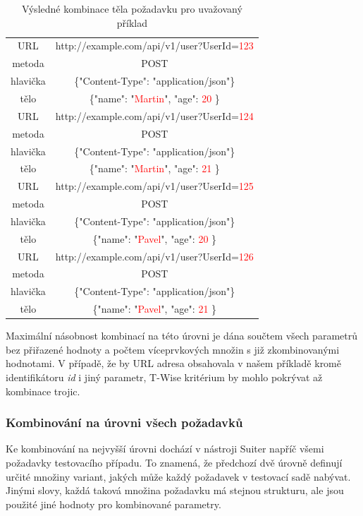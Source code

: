 \begin{table}[h]
\centering
\begin{tabular}{ |c|c| } 
 \hline
URL & http://example.com/api/v1/user?UserId=\textcolor{red}{123} \\
metoda & POST \\
hlavička & \{"Content-Type": "application/json"\} \\
tělo & \{"name": "\textcolor{red}{Martin}", "age": \textcolor{red}{20} \} \\ 
 \hline
URL & http://example.com/api/v1/user?UserId=\textcolor{red}{124} \\
metoda & POST \\
hlavička & \{"Content-Type": "application/json"\} \\
tělo & \{"name": "\textcolor{red}{Martin}", "age": \textcolor{red}{21} \} \\ 
 \hline
URL & http://example.com/api/v1/user?UserId=\textcolor{red}{125} \\
metoda & POST \\
hlavička & \{"Content-Type": "application/json"\} \\
tělo & \{"name": "\textcolor{red}{Pavel}", "age": \textcolor{red}{20} \} \\ 
 \hline
URL & http://example.com/api/v1/user?UserId=\textcolor{red}{126} \\
metoda & POST \\
hlavička & \{"Content-Type": "application/json"\} \\
tělo & \{"name": "\textcolor{red}{Pavel}", "age": \textcolor{red}{21} \} \\ 
 \hline
\end{tabular}
\caption{Výsledné kombinace těla požadavku pro uvažovaný příklad}
\label{table_Exampleeeee2}
\end{table}

Maximální násobnost kombinací na této úrovni je dána součtem všech parametrů bez přiřazené hodnoty a počtem víceprvkových množin s již zkombinovanými hodnotami. V případě, že by URL adresa obsahovala v našem příkladě kromě identifikátoru \textit{id} i jiný parametr, T-Wise kritérium by mohlo pokrývat až kombinace trojic. 



\subsubsection*{Kombinování na úrovni všech požadavků}

Ke kombinování na nejvyšší úrovni dochází v nástroji Suiter napříč všemi požadavky testovacího případu. To znamená, že předchozí dvě úrovně definují určité množiny variant, jakých může každý požadavek v testovací sadě nabývat. Jinými slovy, každá taková množina požadavku má stejnou strukturu, ale jsou použité jiné hodnoty pro kombinované parametry.

